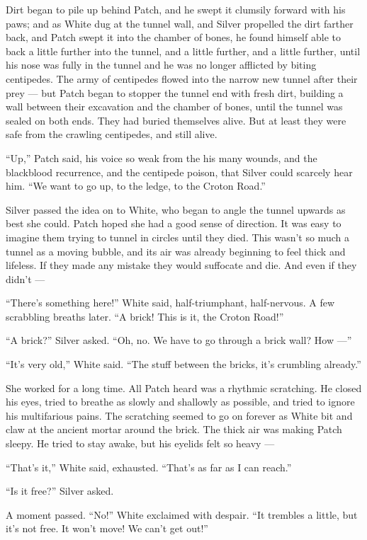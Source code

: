 \documentclass[ebook,oneside,openany,17pt]{memoir}
\begin{document}
Dirt began to pile up behind Patch, and he swept it clumsily forward
with his paws; and as White dug at the tunnel wall, and Silver
propelled the dirt farther back, and Patch swept it into the chamber
of bones, he found himself able to back a little further into the
tunnel, and a little further, and a little further, until his nose was
fully in the tunnel and he was no longer afflicted by biting
centipedes. The army of centipedes flowed into the narrow new tunnel
after their prey — but Patch began to stopper the tunnel end with
fresh dirt, building a wall between their excavation and the chamber
of bones, until the tunnel was sealed on both ends. They had buried
themselves alive. But at least they were safe from the crawling
centipedes, and still alive.

“Up,” Patch said, his voice so weak from the his many wounds, and the
blackblood recurrence, and the centipede poison, that Silver could
scarcely hear him. “We want to go up, to the ledge, to the Croton
Road.”

Silver passed the idea on to White, who began to angle the tunnel
upwards as best she could. Patch hoped she had a good sense of
direction. It was easy to imagine them trying to tunnel in circles
until they died. This wasn’t so much a tunnel as a moving bubble, and
its air was already beginning to feel thick and lifeless. If they made
any mistake they would suffocate and die. And even if they didn’t —

“There’s something here!” White said, half-triumphant, half-nervous. A
few scrabbling breaths later. “A brick! This is it, the Croton Road!”

“A brick?” Silver asked. “Oh, no. We have to go through a brick wall?
How —”

“It’s very old,” White said. “The stuff between the bricks, it’s
crumbling already.”

She worked for a long time. All Patch heard was a rhythmic
scratching. He closed his eyes, tried to breathe as slowly and
shallowly as possible, and tried to ignore his multifarious pains. The
scratching seemed to go on forever as White bit and claw at the
ancient mortar around the brick. The thick air was making Patch
sleepy. He tried to stay awake, but his eyelids felt so heavy —

“That’s it,” White said, exhausted. “That’s as far as I can reach.”

“Is it free?” Silver asked.

A moment passed. “No!” White exclaimed with despair. “It trembles a
little, but it’s not free. It won’t move! We can’t get out!”
\end{document}
